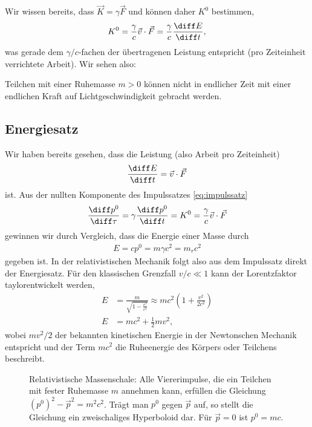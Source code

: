 Wir wissen bereits, dass $\vec K=\gamma \vec F$ und können daher $K^0$ bestimmen,
\begin{align*}
    K^0 = \frac{\gamma}{c}\vec v\cdot \vec F= \frac{\gamma}{c} \frac{\diff E}{\diff t},
\end{align*}
was gerade dem $\gamma/c$-fachen der übertragenen Leistung entspricht (pro Zeiteinheit verrichtete Arbeit). Wir sehen also:
\begin{formal}
    Teilchen mit einer Ruhemasse $m>0$ können nicht in endlicher Zeit mit einer endlichen Kraft auf Lichtgeschwindigkeit gebracht werden\footnotemark.
\end{formal}



\subsection{Energiesatz}

Wir haben bereits gesehen, dass die Leistung (also Arbeit pro Zeiteinheit)
\begin{align*}
    \frac{\diff E}{\diff t} = \vec v\cdot\vec F
\end{align*}
ist. Aus der nullten Komponente des Impulssatzes \eqref{eq:impulssatz}
\begin{align*}
    \frac{\diff p^0}{\diff\tau} = \gamma \frac{\diff p^0}{\diff t}=K^0= \frac{\gamma}{c}\vec v\cdot \vec F
\end{align*}
gewinnen wir durch Vergleich, dass die Energie einer Masse durch
\begin{align*}
    \boxed{E=cp^0=m\gamma c^2 = m_r c^2 }
\end{align*}
gegeben ist. In der relativistischen Mechanik folgt also aus dem Impulssatz direkt der Energiesatz.
Für den klassischen Grenzfall $v/c\ll 1$ kann der Lorentzfaktor taylorentwickelt werden,
\begin{align*}
    E & =\frac{m}{\sqrt{1-\frac{v^2}{c^2}}} \approx mc^2\left(1+\frac{v^2}{2c^2}\right) \\
    E & = mc^2 + \frac{1}{2}mv^2,
\end{align*}
wobei $mv^2/2$ der bekannten kinetischen Energie in der Newtonschen Mechanik entspricht und der Term $mc^2$ die Ruheenergie des Körpers oder Teilchens beschreibt.

\begin{figure}[htb]
    \centering
    \tfigMassenschale
    \caption{Relativistische Massenschale: Alle Viererimpulse, die ein Teilchen mit fester Ruhemasse $m$ annehmen kann, erfüllen die Gleichung $\left(p^0\right)^2-\vec p^2=m^2 c^2$. Trägt man $p^0$ gegen $\vec p$ auf, so stellt die Gleichung ein zweischaliges Hyperboloid dar. Für $\vec p=0$ ist $p^0=mc$. }
    \label{fig:massenschale}
\end{figure}

